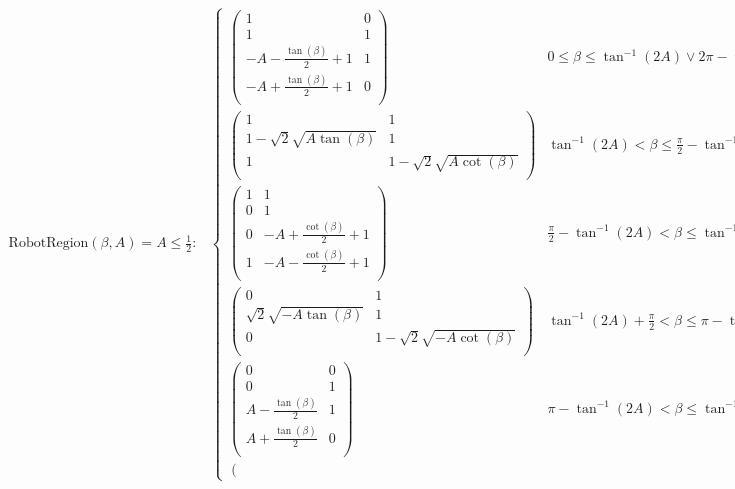 \documentclass[conference]{IEEEtran}
\begin{document}
\begin{table*}
\tiny
\begin{align}
\text{RobotRegion}(\beta,A)= \nonumber 
A\leq \frac{1}{2}:&
\begin{cases}
 \left(
\begin{array}{cc}
 1 & 0 \\
 1 & 1 \\
 -A-\frac{\tan (\beta )}{2}+1 & 1 \\
 -A+\frac{\tan (\beta )}{2}+1 & 0 \\
\end{array}
\right) & 0\leq \beta \leq \tan ^{-1}(2 A)\lor 2 \pi -\tan ^{-1}(2 A)<\beta \leq 2 \pi  \\
 \left(
\begin{array}{cc}
 1 & 1 \\
 1-\sqrt{2} \sqrt{A \tan (\beta )} & 1 \\
 1 & 1-\sqrt{2} \sqrt{A \cot (\beta )} \\
\end{array}
\right) & \tan ^{-1}(2 A)<\beta \leq \frac{\pi }{2}-\tan ^{-1}(2 A) \\
 \left(
\begin{array}{cc}
 1 & 1 \\
 0 & 1 \\
 0 & -A+\frac{\cot (\beta )}{2}+1 \\
 1 & -A-\frac{\cot (\beta )}{2}+1 \\
\end{array}
\right) & \frac{\pi }{2}-\tan ^{-1}(2 A)<\beta \leq \tan ^{-1}(2 A)+\frac{\pi }{2} \\
 \left(
\begin{array}{cc}
 0 & 1 \\
 \sqrt{2} \sqrt{-A \tan (\beta )} & 1 \\
 0 & 1-\sqrt{2} \sqrt{-A \cot (\beta )} \\
\end{array}
\right) & \tan ^{-1}(2 A)+\frac{\pi }{2}<\beta \leq \pi -\tan ^{-1}(2 A) \\
 \left(
\begin{array}{cc}
 0 & 0 \\
 0 & 1 \\
 A-\frac{\tan (\beta )}{2} & 1 \\
 A+\frac{\tan (\beta )}{2} & 0 \\
\end{array}
\right) & \pi -\tan ^{-1}(2 A)<\beta \leq \tan ^{-1}(2 A)+\pi  \\
 \left(

\end{cases}
\end{align}
\end{table*}
\end{document}
